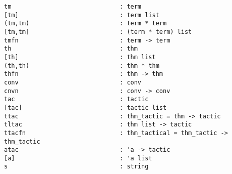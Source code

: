 \documentclass{llncs}
\begin{document}
\newpage

\begingroup
\scriptsize
\begin{verbatim}
tm                              : term
[tm]                            : term list
(tm,tm)                         : term * term
[tm,tm]                         : (term * term) list
tmfn                            : term -> term
th                              : thm
[th]                            : thm list
(th,th)                         : thm * thm
thfn                            : thm -> thm
conv                            : conv
cnvn                            : conv -> conv
tac                             : tactic
[tac]                           : tactic list
ttac                            : thm_tactic = thm -> tactic
tltac                           : thm list -> tactic
ttacfn                          : thm_tactical = thm_tactic -> thm_tactic
atac                            : 'a -> tactic
[a]                             : 'a list
s                               : string
\end{verbatim}
\endgroup
\end{document}
